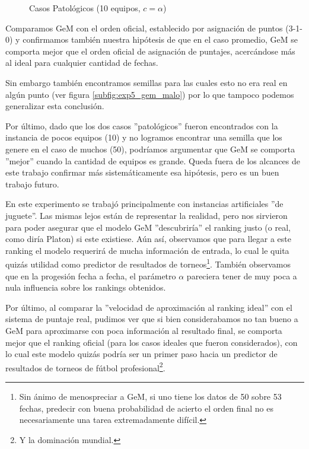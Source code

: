 \begin{figure}[H]
    \caption{Casos Patol\'ogicos (10 equipos, $c = \alpha$)}
    \label{fig:exp5_2}
    \centering
\end{figure}

\par Comparamos GeM con el orden oficial, establecido por asignación de puntos
(3-1-0) y confirmamos tambi\'en nuestra hip\'otesis de que en el caso promedio,
GeM se comporta mejor que el orden oficial de asignaci\'on de puntajes,
acerc\'andose más al ideal para cualquier cantidad de fechas.

\par Sin embargo tambi\'en encontramos semillas para las cuales esto no era real
en alg\'un punto (ver figura \ref{subfig:exp5_gem_malo}) por lo que tampoco
podemos generalizar esta conclusi\'on.

\par Por \'ultimo, dado que los dos casos ''patol\'ogicos'' fueron encontrados
con la instancia de pocos equipos (10) y no logramos encontrar una semilla que
los genere en el caso de muchos (50), podr\'iamos argumentar que GeM se comporta
''mejor'' cuando la cantidad de equipos es grande. Queda fuera de los alcances
de este trabajo confirmar m\'as sistem\'aticamente esa hip\'otesis, pero es un
buen trabajo futuro.

\medskip
\par En este experimento se trabaj\'o principalmente con instancias artificiales
''de juguete''. Las mismas lejos est\'an de representar la realidad, pero nos
sirvieron para poder asegurar que el modelo GeM ''descubrir\'ia'' el ranking
justo (o real, como dir\'ia Platon) si este existiese. A\'un as\'i, observamos
que para llegar a este ranking el modelo requerir\'a de mucha informaci\'on de
entrada, lo cual le quita quiz\'as utilidad como predictor de resultados de
torneos\footnote{Sin \'animo de menospreciar a GeM, si uno tiene los datos de 50
sobre 53 fechas, predecir con buena probabilidad de acierto el orden final no es
necesariamente una tarea extremadamente dif\'icil.}. Tambi\'en observamos que en
la progesi\'on fecha a fecha, el par\'ametro $\alpha$ pareciera tener de muy
poca a nula influencia sobre los rankings obtenidos.

\par Por \'ultimo, al comparar la ''velocidad de aproximaci\'on al ranking ideal'' con el sistema de puntaje real, pudimos ver que si
bien considerabamos no tan bueno a GeM para aproximarse con poca informaci\'on
al resultado final, se comporta mejor que el ranking oficial (para
los casos ideales que fueron considerados), con lo cual este modelo quiz\'as
podr\'ia ser un primer paso hacia un predictor de resultados de torneos de
f\'utbol profesional\footnote{Y la dominaci\'on mundial.}.
